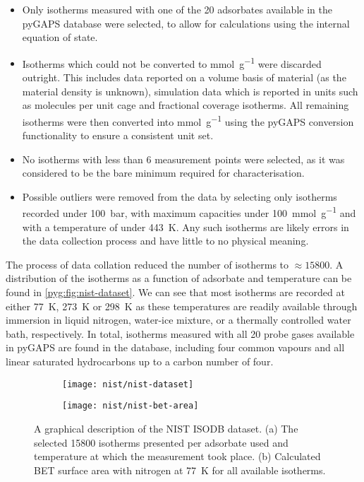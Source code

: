 \begin{itemize}
	\item Only isotherms measured with one of the 20 adsorbates available
	      in the pyGAPS database were selected, to allow for calculations
	      using the internal equation of state.
	\item Isotherms which could not be converted to \si{\milli\mol\per\gram}
	      were discarded outright. This includes data reported
	      on a volume basis of material (as the material density is
	      unknown), simulation data which is reported in units such
	      as molecules per unit cage and fractional coverage isotherms.
	      All remaining isotherms were then converted into
	      \si{\milli\mol\per\gram} using the pyGAPS conversion
	      functionality to ensure a consistent unit set.
	\item No isotherms with less than 6 measurement points were
	      selected, as it was considered to be the bare
	      minimum required for characterisation.
	\item Possible outliers were removed from the data by selecting
	      only isotherms recorded under \SI{100}{\bar}, with maximum capacities
	      under \SI{100}{\milli\mol\per\gram} and with a temperature of under
	      \SI{443}{\kelvin}. Any such isotherms are likely errors in the
	      data collection process and have little to no physical meaning.
\end{itemize}

The process of data collation reduced the number of isotherms
to \(\approx \! 15800\). A distribution of the isotherms as a
function of adsorbate and temperature can be found
in \autoref{pyg:fig:nist-dataset}.
We can see that most isotherms are recorded at either
\SI{77}{\kelvin}, \SI{273}{\kelvin} or \SI{298}{\kelvin} as
these temperatures are readily available through immersion
in liquid nitrogen, water-ice mixture, or a thermally controlled
water bath, respectively. In total, isotherms measured with all 20
probe gases available in pyGAPS are found in the database,
including four common vapours and all linear saturated hydrocarbons
up to a carbon number of four.

\begin{figure}[htb]
	\centering

	\begin{subfigure}[b]{0.5\linewidth}
		\texttt{[image: nist/nist-dataset]}%
		\caption{}%
		\label{pyg:fig:nist-dataset}
	\end{subfigure}%
	\begin{subfigure}[b]{0.45\linewidth}
		\texttt{[image: nist/nist-bet-area]}%
		\caption{}%
		\label{pyg:fig:nist-dataset-area}
	\end{subfigure}%

	\caption{A graphical description of the NIST ISODB dataset.
		(a) The selected 15800 isotherms presented per adsorbate used
		and temperature at which the measurement took place.
		(b) Calculated \gls{BET} surface area with nitrogen at \SI{77}{\kelvin}
		for all available isotherms. }%
	\label{pyg:fig:nist-set}
\end{figure}

